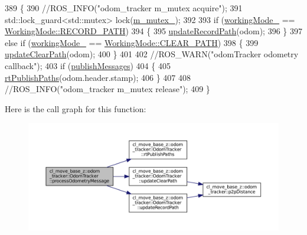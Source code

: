 \begin{DoxyCode}
389         \{
390             \textcolor{comment}{//ROS\_INFO("odom\_tracker m\_mutex acquire");}
391             std::lock\_guard<std::mutex> lock(\hyperlink{classcl__move__base__z_1_1odom__tracker_1_1OdomTracker_aa371639e1eee269273dec8d3ab9dba0f}{m\_mutex\_});
392 
393             \textcolor{keywordflow}{if} (\hyperlink{classcl__move__base__z_1_1odom__tracker_1_1OdomTracker_a5ae598c85c4469f4c0e984480575c42b}{workingMode\_} == \hyperlink{namespacecl__move__base__z_1_1odom__tracker_ac46b05813b2791604f6cd0a39ace3ef8a023bc3adf68871ef7a0c616765ac80a7}{WorkingMode::RECORD\_PATH})
394             \{
395                 \hyperlink{classcl__move__base__z_1_1odom__tracker_1_1OdomTracker_a77a66083573c6bef726d77447fb53349}{updateRecordPath}(odom);
396             \}
397             \textcolor{keywordflow}{else} \textcolor{keywordflow}{if} (\hyperlink{classcl__move__base__z_1_1odom__tracker_1_1OdomTracker_a5ae598c85c4469f4c0e984480575c42b}{workingMode\_} == \hyperlink{namespacecl__move__base__z_1_1odom__tracker_ac46b05813b2791604f6cd0a39ace3ef8a68783989ae56d7f2f9496c66c417a192}{WorkingMode::CLEAR\_PATH})
398             \{
399                 \hyperlink{classcl__move__base__z_1_1odom__tracker_1_1OdomTracker_abe7ba4dbf014e1f2c64b5806ce42c073}{updateClearPath}(odom);
400             \}
401 
402             \textcolor{comment}{//ROS\_WARN("odomTracker odometry callback");}
403             \textcolor{keywordflow}{if} (\hyperlink{classcl__move__base__z_1_1odom__tracker_1_1OdomTracker_a4f253d45ab5750dee3c2f18dd5599725}{publishMessages})
404             \{
405                 \hyperlink{classcl__move__base__z_1_1odom__tracker_1_1OdomTracker_a8f728f85d1f3f49f4b94e37052a59d6d}{rtPublishPaths}(odom.header.stamp);
406             \}
407 
408             \textcolor{comment}{//ROS\_INFO("odom\_tracker m\_mutex release");}
409         \}
\end{DoxyCode}
Here is the call graph for this function\+:
\nopagebreak
\begin{figure}[H]
\begin{center}
\leavevmode
\includegraphics[width=350pt]{classcl__move__base__z_1_1odom__tracker_1_1OdomTracker_a12c5a839cfde2e8f2f55a5e0c9647b18_cgraph}
\end{center}
\end{figure}
